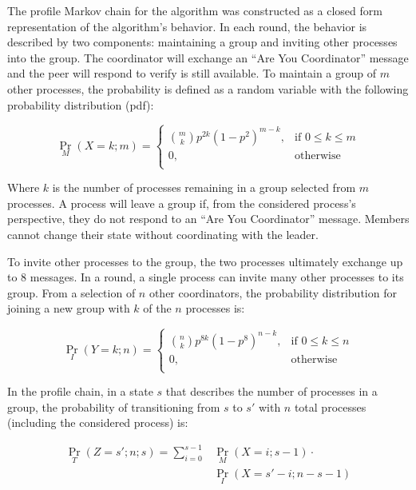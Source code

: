 The profile Markov chain for the algorithm was constructed as a closed form representation of the algorithm's behavior.
In each round, the behavior is described by two components: maintaining a group and inviting other processes into the group.
The coordinator will exchange an ``Are You Coordinator'' message and the peer will respond to verify is still available.
To maintain a group of $m$ other processes, the probability is defined as a random variable with the following probability distribution (pdf):

\begin{equation}
 \Pr_{M}(X=k; m) =
   \begin{cases}
    \binom{m}{k} p^{2k}(1-p^2)^{m-k}, & \text{if } 0 \leq k \leq m \\
    0,                                & \text{otherwise} \\
  \end{cases}
\end{equation}

Where $k$ is the number of processes remaining in a group selected from $m$ processes.
A process will leave a group if, from the considered process's perspective, they do not respond to an ``Are You Coordinator'' message.
Members cannot change their state without coordinating with the leader.

To invite other processes to the group, the two processes ultimately exchange up to 8 messages.
In a round, a single process can invite many other processes to its group.
From a selection of $n$ other coordinators, the probability distribution for joining a new group with $k$ of the $n$ processes is:

\begin{equation}
	\Pr_{I}(Y=k; n) =
	\begin{cases}
		\binom{n}{k} p^{8k}(1-p^8)^{n-k}, & \text{if } 0 \leq k \leq n \\
		0,                                & \text{otherwise} \\
	\end{cases}
\end{equation}

In the profile chain, in a state $s$ that describes the number of processes in a group, the probability of transitioning from $s$ to $s'$ with $n$ total processes (including the considered process) is:

\begin{align} \Pr_{T}(Z=s'; n; s) = \sum_{i=0}^{s-1} &\Pr_{M}(X=i; s-1) \cdot
\nonumber \\ &\Pr_{I}(X=s'-i; n-s-1) \end{align}

